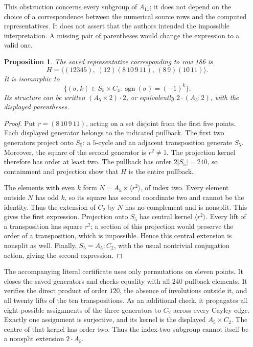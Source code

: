 \documentclass[11pt]{article}
\newtheorem{proposition}{Proposition}
\begin{document}
This obstruction concerns every subgroup of $A_{11}$; it does not depend
on the choice of a correspondence between the numerical source rows and
the computed representatives. It does not assert that the authors intended
the impossible interpretation. A missing pair of parentheses would change
the expression to a valid one.

\begin{proposition}
The saved representative corresponding to row 186 is
\[
 H=\langle (12345),\ (12)(8\,10\,9\,11),\ (8\,9)(10\,11)\rangle.
\]
It is isomorphic to
\[
 \{(\sigma,k)\in S_5\times C_4:
                   \operatorname{sgn}(\sigma)=(-1)^k\}.
\]
Its structure can be written $(A_5\times2)\cdot2$, or equivalently
$2\cdot(A_5:2)$, with the displayed parentheses.
\end{proposition}
\begin{proof}
Put $r=(8\,10\,9\,11)$, acting on a set disjoint from the first five
points. Each displayed generator belongs to the indicated pullback.
The first two generators project onto $S_5$: a $5$-cycle and an adjacent
transposition generate $S_5$. Moreover, the square of the second generator
is $r^2\ne1$. The projection kernel therefore has order at least two.
The pullback has order $2|S_5|=240$, so containment and projection show
that $H$ is the entire pullback.

The elements with even $k$ form $N=A_5\times\langle r^2\rangle$,
of index two. Every element outside $N$ has odd $k$, so its square has
second coordinate two and cannot be the identity. Thus the extension
of $C_2$ by $N$ has no complement and is nonsplit. This gives the first
expression. Projection onto $S_5$ has central kernel $\langle r^2\rangle$.
Every lift of a transposition has square $r^2$; a section of this
projection would preserve the order of a transposition, which is
impossible. Hence this central extension is nonsplit as well. Finally,
$S_5=A_5:C_2$, with the usual nontrivial conjugation action, giving the
second expression.
\end{proof}

The accompanying literal certificate uses only permutations on eleven
points. It closes the saved generators and checks equality with all $240$
pullback elements. It verifies the direct product of order $120$, the
absence of involutions outside it, and all twenty lifts of the ten
transpositions. As an additional check, it propagates all eight possible
assignments of the three generators to $C_2$ across every Cayley edge.
Exactly one assignment is surjective, and its kernel is the displayed
$A_5\times C_2$. The centre of that kernel has order two. Thus the
index-two subgroup cannot itself be a nonsplit extension $2\cdot A_5$.
\end{document}

